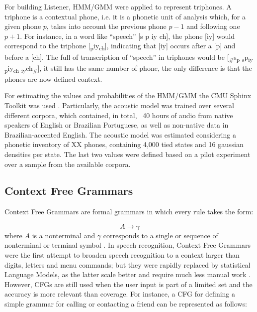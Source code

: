 \documentclass[twocolumn]{bmcart}%
\begin{document}
For building Listener, HMM/GMM were applied to represent triphones. A triphone is a contextual phone, i.e. it is a phonetic unit of analysis which, for a given phone $p$, takes into account the previous phone $p-1$ and following one $p+1$. For instance, in a word like ``speech'' [s p iy ch], the phone [iy] would correspond to the triphone [\textsubscript{p}iy\textsubscript{ch}], indicating that [iy] occurs after a [p] and before a [ch]. The full of transcription of ``speech'' in triphones would be [\textsubscript{\#}s\textsubscript{p} \textsubscript{s}p\textsubscript{iy} \textsubscript{p}iy\textsubscript{ch} \textsubscript{iy}ch\textsubscript{\#}], it still has the same number of phone, the only difference is that the phones are now defined context.

For estimating the values and probabilities of the HMM/GMM the CMU Sphinx Toolkit was used \cite{Walker2004}. 
Particularly, the acoustic model was trained over several different corpora, which contained, in total, ~40 hours of audio from native speakers of English or Brazilian Portuguese, as well as non-native data in Brazilian-accented English. The acoustic model was estimated considering a phonetic inventory of XX phones, containing 4,000 tied states and 16 gaussian densities per state. The last two values were defined based on a pilot experiment over a sample from the available corpora.


\subsection*{\textbf{Context Free Grammars}}

Context Free Grammars are formal grammars in which every rule takes the form:

\begin{equation}
A \rightarrow \gamma
\end{equation}
where $A$ is a nonterminal and $\gamma$ corresponds to a single or sequence of nonterminal or terminal symbol \cite{Jurafsky2000}. In speech recognition, Context Free Grammars were the first attempt to broaden speech recognition to a context larger than digits, letters and menu commands; but they were rapidly replaced by statistical Language Models, as the latter scale better and require much less manual work \cite{Gales2008}. However, CFGs are still used when the user input is part of a limited set and the accuracy is more relevant than coverage. For instance, a CFG for defining a simple grammar for calling or contacting a friend can be represented as follows:
\end{document}
